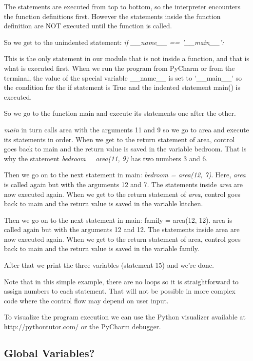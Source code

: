 \documentclass{article}
\begin{document}
The statements are executed from top to bottom, so the interpreter encounters the function definitions first.  However the statements inside the function definition are NOT executed until the function is called.

So we get to the unindented statement: \textit{if {\_}{\_}name{\_}{\_} == '{\_}{\_}main{\_}{\_}':}

This is the only statement in our module that is not inside a function, and that is what is executed first.  When we run the program from PyCharm or from the terminal, the value of the special variable {\_}{\_}name{\_}{\_} is set to '{\_}{\_}main{\_}{\_}'  so the condition for the if statement is True and the indented statement main() is executed.

So we go to the function main and execute its statements one after the other.

\textit{main} in turn calls area with the arguments 11 and 9 so we go to area and execute its statements in order.  When we get to the return statement of area, control goes back to main and the return value is saved in the variable bedroom.  That is why the statement  \textit{bedroom = area(11, 9)}  has two numbers 3 and 6.

Then we go on to the next statement in main:   \textit{bedroom = area(12, 7)}.  Here, \textit{area} is called again but with the arguments 12 and 7.  The statements inside \textit{area} are now executed again.  When we get to the return statement of \textit{area}, control goes back to main and the return value is saved in the variable kitchen.

Then we go on to the next statement in main:   family = area(12, 12).  area is called again but with the arguments 12 and 12.  The statements inside area are now executed again.  When we get to the return statement of area, control goes back to main and the return value is saved in the variable family.

After that we print the three variables (statement 15) and we're done.

Note that in this simple example, there are no loops so it is straightforward to assign numbers to each statement. That will not be possible in more complex code where the control flow may depend on user input.

To visualize the program execution we can use the Python visualizer available  at http://pythontutor.com/  or the PyCharm debugger.

\subsection{Global Variables?}
\end{document}
